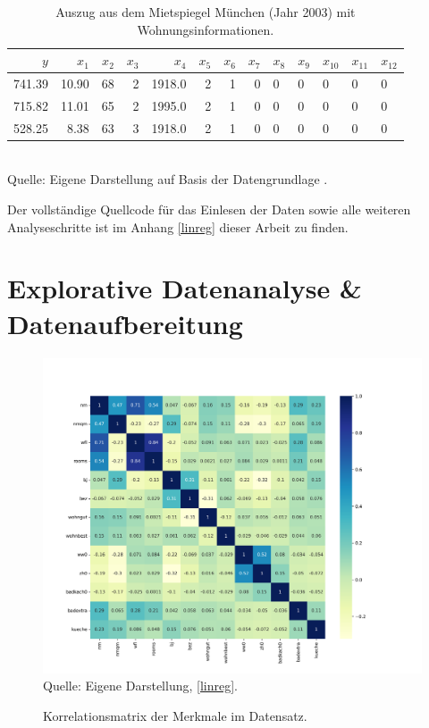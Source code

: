\begin{table}[h]
    \caption{Auszug aus dem Mietspiegel München (Jahr 2003) mit Wohnungsinformationen.}
    \footnotesize
    \begin{tabularx}{\textwidth}{rrrrrrrrXXXXX}
    \toprule
    $y$ & $x_1$ & $x_2$ & $x_3$ &$x_4$ & $x_5$ & $x_6$ & $x_7$ & $x_8$ & $x_9$ & $x_{10}$ & $x_{11}$ & $x_{12}$ \\
    \midrule
    741.39 & 10.90 & 68  & 2     & 1918.0 & 2   & 1       & 0        & 0   & 0   & 0        & 0        & 0      \\
    715.82 & 11.01 & 65  & 2     & 1995.0 & 2   & 1       & 0        & 0   & 0   & 0        & 0        & 0      \\
    528.25 & 8.38  & 63  & 3     & 1918.0 & 2   & 1       & 0        & 0   & 0   & 0        & 0        & 0      \\
    \bottomrule
    \end{tabularx}
    \label{tab:df-head}
    \normalsize\\
    Quelle: Eigene Darstellung auf Basis der Datengrundlage \cite{Open_Access_LMU_2010}.
\end{table}

Der vollständige Quellcode für das Einlesen der Daten sowie alle weiteren Analyseschritte ist 
im Anhang \ref{linreg} dieser Arbeit zu finden.

\section{Explorative Datenanalyse \& Datenaufbereitung}

\begin{figure}[h]
    \caption{Korrelationsmatrix der Merkmale im Datensatz.}
    \includegraphics[width=1\textwidth]{../scripts/images/corr.png}
    Quelle: Eigene Darstellung, \ref{linreg}.
    \label{pic:corr}
\end{figure}

